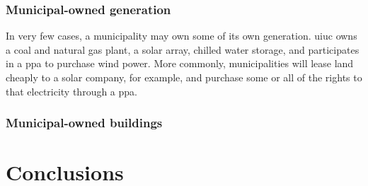\subsection{Municipal-owned generation}
In very few cases, a municipality may own some of its own generation. \ac{uiuc}
owns a coal and natural gas plant, a solar array, chilled water storage, and
participates in a \ac{ppa} to purchase wind power. More commonly, municipalities
will lease land cheaply to a solar company, for example, and purchase some or
all of the rights to that electricity through a \ac{ppa}. 

\subsection{Municipal-owned buildings}

\fi

\chapter{Conclusions}
